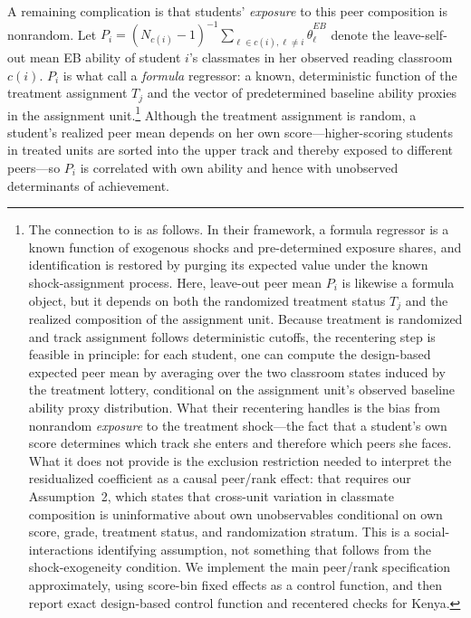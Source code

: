 \documentclass[11pt]{article}
\begin{document}
A remaining complication is that students' \emph{exposure} to this peer composition is nonrandom. Let $P_i = (N_{c(i)}-1)^{-1}\sum_{\ell \in c(i),\ell \neq i}\hat{\theta}^{EB}_{\ell}$ denote the leave-self-out mean EB ability of student $i$'s classmates in her observed reading classroom $c(i)$. $P_i$ is what \citet{borusyak2023nonrandom} call a \emph{formula} regressor: a known, deterministic function of the treatment assignment $T_j$ and the vector of predetermined baseline ability proxies in the assignment unit.\footnote{The connection to \citet{borusyak2023nonrandom} is as follows. In their framework, a formula regressor is a known function of exogenous shocks and pre-determined exposure shares, and identification is restored by purging its expected value under the known shock-assignment process. Here, leave-out peer mean $P_i$ is likewise a formula object, but it depends on both the randomized treatment status $T_j$ and the realized composition of the assignment unit. Because treatment is randomized and track assignment follows deterministic cutoffs, the \citeauthor{borusyak2023nonrandom} recentering step is feasible in principle: for each student, one can compute the design-based expected peer mean by averaging over the two classroom states induced by the treatment lottery, conditional on the assignment unit's observed baseline ability proxy distribution. What their recentering handles is the bias from nonrandom \emph{exposure} to the treatment shock---the fact that a student's own score determines which track she enters and therefore which peers she faces. What it does not provide is the exclusion restriction needed to interpret the residualized coefficient as a causal peer/rank effect: that requires our Assumption~2, which states that cross-unit variation in classmate composition is uninformative about own unobservables conditional on own score, grade, treatment status, and randomization stratum. This is a social-interactions identifying assumption, not something that follows from the \citeauthor{borusyak2023nonrandom} shock-exogeneity condition. We implement the main peer/rank specification approximately, using score-bin fixed effects as a control function, and then report exact design-based control function and recentered checks for Kenya.} Although the treatment assignment is random, a student's realized peer mean depends on her own score---higher-scoring students in treated units are sorted into the upper track and thereby exposed to different peers---so $P_i$ is correlated with own ability and hence with unobserved determinants of achievement.
\end{document}
